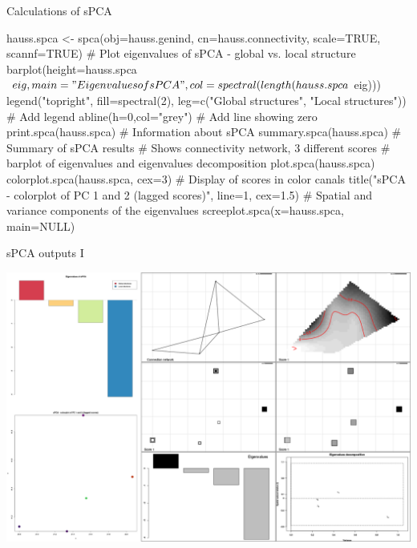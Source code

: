 \documentclass[compress, ucs, xelatex, 11pt, xcolor=svgnames,
  hyperref={
    bookmarks=true,
    unicode=true,
    colorlinks=true,
    pdftitle={Molecular data in R},
    plainpages=false,
    pdfauthor={Vojtech Zeisek},
    pdfsubject={Course about phylogeny and evolution in R},
    pdfcreator={XeLaTeX},
    pdfkeywords={R, evolution, phylogeny, molecular data},
    linkcolor=Tomato,
    anchorcolor=SaddleBrown,
    citecolor=Goldenrod,
    filecolor=DarkMagenta,
    menucolor=Sienna,
    urlcolor=DarkTurquoise,
    pdftex},
  url={hyphens, lowtilde} %
  ]{beamer}
\begin{document}
\begin{frame}[fragile]{Calculations of sPCA}
  \begin{spluscode}
    hauss.spca <- spca(obj=hauss.genind, cn=hauss.connectivity,
      scale=TRUE, scannf=TRUE)
    # Plot eigenvalues of sPCA - global vs. local structure
    barplot(height=hauss.spca$eig, main="Eigenvalues of sPCA",
      col=spectral(length(hauss.spca$eig)))
    legend("topright", fill=spectral(2), leg=c("Global structures",
      "Local structures")) # Add legend
    abline(h=0,col="grey") # Add line showing zero
    print.spca(hauss.spca) # Information about sPCA
    summary.spca(hauss.spca) # Summary of sPCA results
    # Shows connectivity network, 3 different scores
    # barplot of eigenvalues and eigenvalues decomposition
    plot.spca(hauss.spca)
    colorplot.spca(hauss.spca, cex=3) # Display of scores in color canals
    title("sPCA - colorplot of PC 1 and 2 (lagged scores)", line=1, cex=1.5)
    # Spatial and variance components of the eigenvalues
    screeplot.spca(x=hauss.spca, main=NULL)
  \end{spluscode}
\end{frame}

\begin{frame}{sPCA outputs I}
  \begin{center}
    \includegraphics[width=\textwidth-1.5cm]{spca.png}
  \end{center}
\end{frame}
\end{document}
